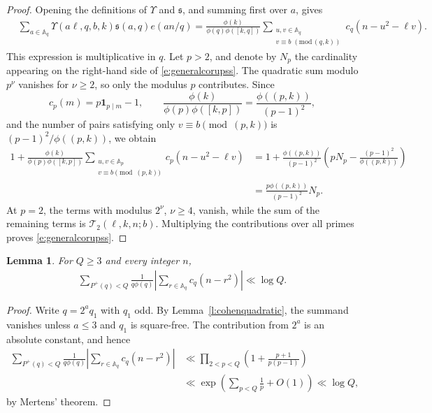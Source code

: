 \documentclass[12pt,reqno]{amsart}
\numberwithin{equation}{section}
\newtheorem{lemma}[equation]{Lemma}
\theoremstyle{definition}
\theoremstyle{remark}
\begin{document}
\begin{proof}
Opening the definitions of \(\Upsilon\) and \(\mathfrak s\), and
summing first over \(a\), gives
\begin{align}\label{e:fixedqcoefficient}
 &\sum_{a\in\mathbb A_q}
 \Upsilon(a\ell,q,b,k)\mathfrak s(a,q)e(an/q)=
 \frac{\phi(k)}{\phi(q)\phi([k,q])}
 \sum_{\substack{u,v\in\mathbb A_q\\
 v\equiv b\;(\mathrm{mod}\,(q,k))}}
 c_q(n-u^2-\ell v).
\end{align}
This expression is multiplicative in \(q\). Let \(p>2\), and denote by \(N_p\) the
cardinality appearing on the right-hand side of
\eqref{e:generalcorupss}.  The quadratic sum modulo \(p^\nu\) vanishes
for \(\nu\geq2\), so only the modulus \(p\) contributes.  Since
\[
 c_p(m)=p\mathbf1_{p\mid m}-1,
 \qquad
 \frac{\phi(k)}{\phi(p)\phi([k,p])}
 =\frac{\phi((p,k))}{(p-1)^2},
\]
and the number of pairs satisfying only
\(v\equiv b\pmod{(p,k)}\) is
\((p-1)^2/\phi((p,k))\), we obtain
\begin{align*}
 1+\frac{\phi(k)}{\phi(p)\phi([k,p])}
 \sum_{\substack{u,v\in\mathbb A_p\\
 v\equiv b\pmod{(p,k)}}}
 c_p(n-u^2-\ell v)
 &=
 1+\frac{\phi((p,k))}{(p-1)^2}
 \left(pN_p-\frac{(p-1)^2}{\phi((p,k))}\right)\\
 &=
 \frac{p\phi((p,k))}{(p-1)^2}N_p.
\end{align*}
At \(p=2\), the terms with modulus \(2^\nu\), \(\nu\geq4\), vanish,
while the sum of the remaining terms is
\(\mathcal T_2(\ell,k,n;b)\).  Multiplying the contributions over all
primes proves \eqref{e:generalcorupss}.
\end{proof}

\begin{lemma}\label{l:lowramanujan}
For $Q\geq3$ and every integer $n$,
\begin{align}
 \sum_{P^+(q)<Q}\frac1{q\phi(q)}
 \left|\sum_{r\in\mathbb A_q}c_q(n-r^2)\right|
 \ll\log Q.
\end{align}
\end{lemma}

\begin{proof}
Write $q=2^aq_1$ with $q_1$ odd.  By
Lemma~\ref{l:cohenquadratic}, the summand vanishes unless $a\leq3$ and
$q_1$ is square-free.  The contribution from $2^a$ is an absolute constant,
and hence
\begin{align*}
 \sum_{P^+(q)<Q}\frac1{q\phi(q)}
 \left|\sum_{r\in\mathbb A_q}c_q(n-r^2)\right|
 &\ll\prod_{2<p<Q}\left(1+\frac{p+1}{p(p-1)}\right)\\
 &\ll\exp\left(\sum_{p<Q}\frac1p+O(1)\right)
 \ll\log Q,
\end{align*}
by Mertens' theorem.
\end{proof}
\end{document}

